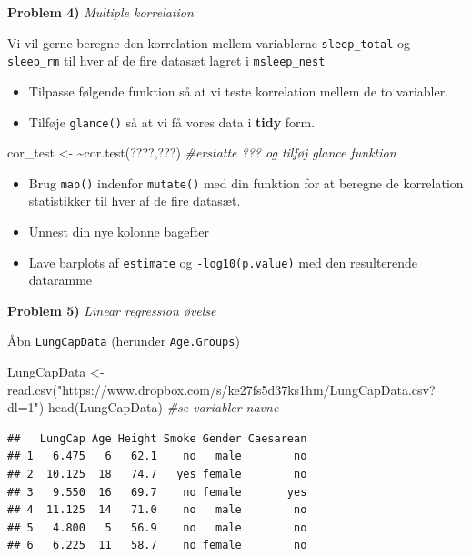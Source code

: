 \documentclass[
]{book}
\newenvironment{Shaded}{\begin{snugshade}}{\end{snugshade}}
\newcommand{\CommentTok}[1]{\textcolor[rgb]{0.56,0.35,0.01}{\textit{#1}}}
\newcommand{\ErrorTok}[1]{\textcolor[rgb]{0.64,0.00,0.00}{\textbf{#1}}}
\newcommand{\FunctionTok}[1]{\textcolor[rgb]{0.00,0.00,0.00}{#1}}
\newcommand{\NormalTok}[1]{#1}
\newcommand{\OtherTok}[1]{\textcolor[rgb]{0.56,0.35,0.01}{#1}}
\newcommand{\StringTok}[1]{\textcolor[rgb]{0.31,0.60,0.02}{#1}}
\providecommand{\tightlist}{%
  \setlength{\itemsep}{0pt}\setlength{\parskip}{0pt}}
\begin{document}
\textbf{Problem 4)} \emph{Multiple korrelation}

Vi vil gerne beregne den korrelation mellem variablerne \texttt{sleep\_total} og \texttt{sleep\_rm} til hver af de fire datasæt lagret i \texttt{msleep\_nest}

\begin{itemize}
\tightlist
\item
  Tilpasse følgende funktion så at vi teste korrelation mellem de to variabler.
\item
  Tilføje \texttt{glance()} så at vi få vores data i \textbf{tidy} form.
\end{itemize}

\begin{Shaded}
\begin{Highlighting}[]
\NormalTok{cor\_test }\OtherTok{\textless{}{-}} \ErrorTok{\textasciitilde{}}\FunctionTok{cor.test}\NormalTok{(????,???) }\CommentTok{\#erstatte ??? og tilføj glance funktion}
\end{Highlighting}
\end{Shaded}

\begin{itemize}
\item
  Brug \texttt{map()} indenfor \texttt{mutate()} med din funktion for at beregne de korrelation statistikker til hver af de fire datasæt.
\item
  Unnest din nye kolonne bagefter
\item
  Lave barplots af \texttt{estimate} og \texttt{-log10(p.value)} med den resulterende dataramme
\end{itemize}

\textbf{Problem 5)} \emph{Linear regression øvelse}

Åbn \texttt{LungCapData} (herunder \texttt{Age.Groups})

\begin{Shaded}
\begin{Highlighting}[]
\NormalTok{LungCapData }\OtherTok{\textless{}{-}} \FunctionTok{read.csv}\NormalTok{(}\StringTok{"https://www.dropbox.com/s/ke27fs5d37ks1hm/LungCapData.csv?dl=1"}\NormalTok{)}
\FunctionTok{head}\NormalTok{(LungCapData) }\CommentTok{\#se variabler navne}
\end{Highlighting}
\end{Shaded}

\begin{verbatim}
##   LungCap Age Height Smoke Gender Caesarean
## 1   6.475   6   62.1    no   male        no
## 2  10.125  18   74.7   yes female        no
## 3   9.550  16   69.7    no female       yes
## 4  11.125  14   71.0    no   male        no
## 5   4.800   5   56.9    no   male        no
## 6   6.225  11   58.7    no female        no
\end{verbatim}
\end{document}
